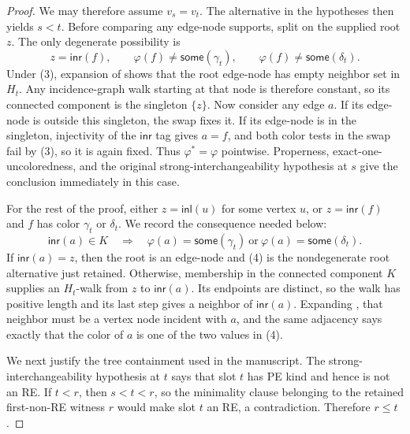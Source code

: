 \begin{proof}
We may therefore assume \(v_s=v_t\).  The alternative in the hypotheses
then yields \(s<t\).  Before comparing any edge-node supports, split on
the supplied root \(z\).  The only degenerate possibility is
\[
 z=\mathsf{inr}(f),\qquad
 \varphi(f)\ne\mathsf{some}(\gamma_t),\qquad
 \varphi(f)\ne\mathsf{some}(\delta_t).                         \tag{3}
\]
Under (3), expansion of  shows that the
root edge-node has empty neighbor set in \(H_t\).  Any incidence-graph
walk starting at that node is therefore constant, so its connected
component is the singleton \(\{z\}\).  Now consider any edge \(a\).  If
its edge-node is outside this singleton, the swap fixes it.  If its
edge-node is in the singleton, injectivity of the \(\mathsf{inr}\) tag
gives \(a=f\), and both color tests in the swap fail by (3), so it is
again fixed.  Thus \(\varphi^*=\varphi\) pointwise.  Properness,
exact-one-uncoloredness, and the original strong-interchangeability
hypothesis at \(s\) give the conclusion immediately in this case.

For the rest of the proof, either \(z=\mathsf{inl}(u)\) for some vertex
\(u\), or \(z=\mathsf{inr}(f)\) and \(f\) has color \(\gamma_t\) or
\(\delta_t\).  We record the consequence needed below:
\[
 \mathsf{inr}(a)\in K
 \quad\Longrightarrow\quad
 \varphi(a)=\mathsf{some}(\gamma_t)
       \ \text{or}\
 \varphi(a)=\mathsf{some}(\delta_t).                           \tag{4}
\]
If \(\mathsf{inr}(a)=z\), then the root is an edge-node and (4) is the
nondegenerate root alternative just retained.  Otherwise, membership in
the connected component \(K\) supplies an \(H_t\)-walk from \(z\) to
\(\mathsf{inr}(a)\).  Its endpoints are distinct, so the walk has positive
length and its last step gives a neighbor of \(\mathsf{inr}(a)\).
Expanding \noderef{TwoColorIncidenceGraph}, that neighbor must be a vertex
node incident with \(a\), and the same adjacency says exactly that the
color of \(a\) is one of the two values in (4).

We next justify the tree containment used in the manuscript.  The
strong-interchangeability hypothesis at \(t\) says that slot \(t\) has PE
kind and hence is not an RE.  If \(t<r\), then \(s<t<r\), so the
minimality clause belonging to the retained first-non-RE witness \(r\)
would make slot \(t\) an RE, a contradiction.  Therefore \(r\le t\).


\end{proof}
